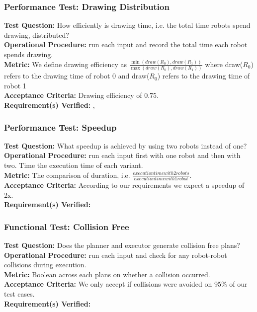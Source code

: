 \subsubsection{Performance Test: Drawing Distribution}
\label{test:sdp_pt_draw}
\textbf{Test Question:} How efficiently is drawing time, i.e. the total time robots spend drawing, distributed? \\
\textbf{Operational Procedure:}  run each input and record the total time each robot spends drawing. \\
\textbf{Metric:} We define drawing efficiency as $\frac{\min(draw(R_{0}), draw(R_{1}))}{\max(draw(R_{0}), draw(R_{1}))}$ where draw($R_{0}$) refers to the drawing time of robot 0 and draw($R_{0}$) refers to the drawing time of robot 1\\
\textbf{Acceptance Criteria:} Drawing efficiency of 0.75.\\
\textbf{Requirement(s) Verified:} , 

\subsubsection{Performance Test: Speedup}
\label{test:sdp_pt_speedup}
\textbf{Test Question:} What speedup is achieved by using two robots instead of one?\\
\textbf{Operational Procedure:}  run each input first with one robot and then with two. Time the execution time of each variant.\\
\textbf{Metric:} The comparison of duration, i.e. $\frac{execution time with 2 robots}{execution time with 1 robot}$. \\
\textbf{Acceptance Criteria:} According to our requirements we expect a speedup of 2x. \\
\textbf{Requirement(s) Verified:} 

\subsubsection{Functional Test: Collision Free}
\label{test:sdp_ft_collision}
\textbf{Test Question:} Does the planner and executor generate collision free plans?\\
\textbf{Operational Procedure:}  run each input and check for any robot-robot collisions during execution. \\
\textbf{Metric:} Boolean across each plans on whether a collision occurred.\\
\textbf{Acceptance Criteria:} We only accept if collisions were avoided on 95\% of our test cases. \\
\textbf{Requirement(s) Verified:} 

